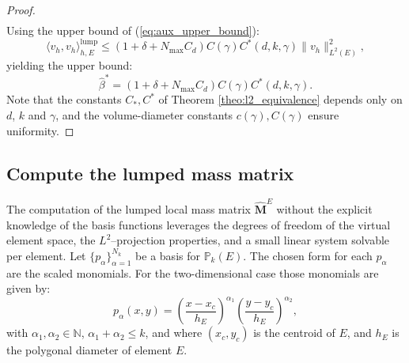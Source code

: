 \documentclass{article}
\renewcommand{\P}[1]{\mathbb{P}_k(#1)}
\newcommand{\lebesguespace}[1]{L^2(#1)}
\begin{document}
\begin{proof}
\begin{equation}
\begin{split}
        \end{split}
    \end{equation}
    Using the upper bound of (\ref{eq:aux_upper_bound}):
    \begin{equation}
        \nonumber
        \langle v_h, v_h \rangle^{\text{lump}}_{h,E} \leq (1+ \delta + N_{\max}C_d) C(\gamma) C^*(d,k,\gamma) \| v_h \|^2_{\lebesguespace{E}},
    \end{equation}
    yielding the upper bound:
    \begin{equation}
        \nonumber
        \hat{\beta}^* = (1+ \delta + N_{\max}C_d) C(\gamma) C^*(d,k,\gamma).
    \end{equation}
    Note that the constants $C_*, C^*$ of Theorem \ref{theo:l2_equivalence} depends only on $d$, $k$ and $\gamma$, and the volume-diameter constants $c(\gamma), C(\gamma)$ ensure uniformity. 
\end{proof}

\subsection{Compute the lumped mass matrix}
\label{sec:compute_lumped_mass_matrix}
The computation of the lumped local mass matrix $\hat{\mathbf{M}}^E$ without the explicit knowledge of the basis functions leverages the degrees of freedom of the virtual element space, the $L^2$--projection properties, and a small linear system solvable per element. Let $\{ p_\alpha \}^{N_k}_{\alpha=1}$ be a basis for $\P{E}$. The chosen form for each $p_\alpha$ are the scaled monomials. For the two-dimensional case those monomials are given by:
\begin{equation}
    \nonumber
    p_\alpha (x,y) = \left( \frac{x - x_c}{h_E} \right)^{\alpha_1} \left( \frac{y - y_c}{h_E} \right)^{\alpha_2},
\end{equation}
with $\alpha_1, \alpha_2 \in \mathbb{N}$, $\alpha_1 + \alpha_2 \leq k$, and where $(x_c, y_c)$ is the centroid of $E$, and $h_E$ is the polygonal diameter of element $E$.
\end{document}
